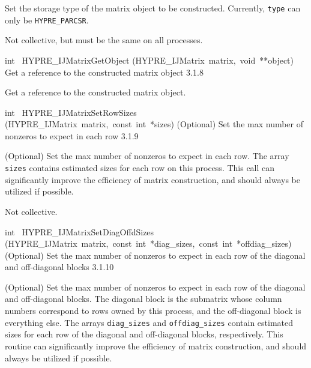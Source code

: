 \documentclass{article}
\begin{document}
\begin{cxxentry}
\begin{cxxentry}
\begin{cxxfunction}
\begin{cxxdoc}
Set the storage type of the matrix object to be constructed.
Currently, {\tt type} can only be {\tt HYPRE\_PARCSR}.

Not collective, but must be the same on all processes.


\end{cxxdoc}
\end{cxxfunction}
\begin{cxxfunction}
{int\ }
        {HYPRE\_IJMatrixGetObject}
        {(HYPRE\_IJMatrix\ matrix,\ void\ **object)}
        {
Get a reference to the constructed matrix object}
        {3.1.8}
\begin{cxxdoc}

Get a reference to the constructed matrix object.


\end{cxxdoc}
\end{cxxfunction}
\begin{cxxfunction}
{int\ }
        {HYPRE\_IJMatrixSetRowSizes}
        {(HYPRE\_IJMatrix\ matrix,\ const\ int\ *sizes)}
        {
(Optional) Set the max number of nonzeros to expect in each row}
        {3.1.9}
\begin{cxxdoc}

(Optional) Set the max number of nonzeros to expect in each row.
The array {\tt sizes} contains estimated sizes for each row on this
process.  This call can significantly improve the efficiency of
matrix construction, and should always be utilized if possible.

Not collective.
\end{cxxdoc}
\end{cxxfunction}
\begin{cxxfunction}
{int\ }
        {HYPRE\_IJMatrixSetDiagOffdSizes}
        {(HYPRE\_IJMatrix\ matrix,\ const\ int\ *diag\_sizes,\ const\ int\ *offdiag\_sizes)}
        {
(Optional) Set the max number of nonzeros to expect in each row of
the diagonal and off-diagonal blocks}
        {3.1.10}
\begin{cxxdoc}

(Optional) Set the max number of nonzeros to expect in each row of
the diagonal and off-diagonal blocks.  The diagonal block is the
submatrix whose column numbers correspond to rows owned by this
process, and the off-diagonal block is everything else.  The arrays
{\tt diag\_sizes} and {\tt offdiag\_sizes} contain estimated sizes
for each row of the diagonal and off-diagonal blocks, respectively.
This routine can significantly improve the efficiency of matrix
construction, and should always be utilized if possible.


\end{cxxdoc}
\end{cxxfunction}
\end{cxxentry}
\end{cxxentry}
\end{document}
